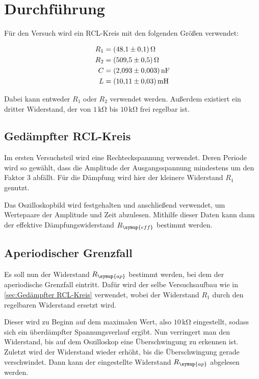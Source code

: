 \section{Durchführung}
\label{sec:Durchführung}

Für den Versuch wird ein RCL-Kreis mit den folgenden Größen verwendet:

\begin{align*}
    R_{1} &= \qty{48.1+-0.1}{\ohm} \\ \notag
    R_{2} &= \qty{509.5+-0.5}{\ohm} \\ \notag
    C &= \qty{2.093+-0.003}{\nano\farad} \\ \notag
    L &= \qty{10.11+-0.03}{\milli\henry} \notag
\end{align*}

Dabei kann entweder $R_{1}$ oder $R_{2}$ verwendet werden.
Außerdem existiert ein dritter Widerstand, der von $1\,\unit{\kilo\ohm}$ bis $10\,\unit{\kilo\ohm}$ frei regelbar ist.

\subsection{Gedämpfter RCL-Kreis}
\label{sec:Gedämpfter RCL-Kreis}

Im ersten Versuchsteil wird eine Rechteckspannung verwendet. Deren Periode wird so gewählt, dass die Amplitude der Ausgangsspannung
mindestens um den Faktor 3 abfällt.
Für die Dämpfung wird hier der kleinere Widerstand $R_{1}$ genutzt.

Das Oszilloskopbild wird festgehalten und anschließend verwendet, um Wertepaare der Amplitude und Zeit abzulesen.
Mithilfe dieser Daten kann dann der effektive Dämpfungswiderstand $R_{\symup{eff}}$ bestimmt werden.

\subsection{Aperiodischer Grenzfall}
\label{sec:Aperiodischer Grenzfall Durchführung}

Es soll nun der Widerstand $R_{\symup{ap}}$ bestimmt werden, bei dem der aperiodische Grenzfall eintritt.
Dafür wird der selbe Versuchsaufbau wie in \autoref{sec:Gedämpfter RCL-Kreis} verwendet, wobei der Widerstand $R_{1}$
durch den regelbaren Widerstand ersetzt wird.

Dieser wird zu Beginn auf dem maximalen Wert, also $10\,\unit{\kilo\ohm}$ eingestellt, sodass sich ein überdämpfter Spannungsverlauf ergibt.
Nun verringert man den Widerstand, bis auf dem Oszilloskop eine Überschwingung zu erkennen ist.
Zuletzt wird der Widerstand wieder erhöht, bis die Überschwingung gerade verschwindet.
Dann kann der eingestellte Widerstand $R_{\symup{ap}}$ abgelesen werden.

